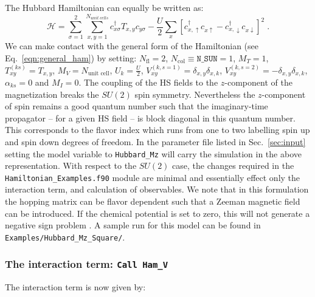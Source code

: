 The Hubbard Hamiltonian can equally be written as:
\begin{equation}
\label{eqn_hubbard_Mz}
\mathcal{H}=
\sum\limits_{\sigma=1}^{2} 
\sum\limits_{x,y =1 }^{N_{unit\; cells }} 
  c^{\dagger}_{x \sigma} T_{x,y}c^{\phantom\dagger}_{y \sigma} 
- \frac{U}{2}\sum\limits_{x}\left[
c^{\dagger}_{x, \uparrow} c^{\phantom\dagger}_{x \uparrow}  -   c^{\dagger}_{x, \downarrow} c^{\phantom\dagger}_{x \downarrow}  \right]^{2}\;.
\end{equation} 
We can make contact with the general form of the Hamiltonian  (see Eq.~\ref{eqn:general_ham}) by setting: 
$N_{\mathrm{fl}} = 2$, $N_{\mathrm{col}} \equiv \texttt{N\_SUN}     =1 $,   $M_T    =    1$,  $T^{(ks)}_{x y}   =  T_{x,y}$,  $M_V   =  N_{\text{unit cell}} $,  $U_{k}       =   \frac{U}{2}$, 
 $V_{x y}^{(k, s=1)} =  \delta_{x,y} \delta_{x,k}  $,  $V_{x y}^{(k, s=2)} =  - \delta_{x,y} \delta_{x,k}  $,  $\alpha_{ks}   = 0  $ and $M_I       = 0 $.   
 The coupling of the HS fields to the $z$-component of   the magnetization breaks the $SU(2)$ spin symmetry. Nevertheless the $z$-component of spin remains a good quantum number such that  the imaginary-time propagator -- for a given HS field -- is block  diagonal in this quantum number. This corresponds to the flavor index  which runs from one to two  labelling spin up and spin down  degrees of freedom.       In the parameter file  listed in  Sec.~\ref{sec:input}  setting the model variable to  \texttt{Hubbard\_Mz}  will carry the simulation in the above representation. 
 With respect to the $SU(2)$ case, the changes required in the \texttt{Hamiltonian\_Examples.f90}   module are  minimal and essentially effect only the interaction term, and calculation of observables.  We note that  in this formulation the  hopping matrix can be flavor dependent such that a Zeeman  magnetic field can be introduced.  If the chemical potential is set to zero, this will not generate a negative sign problem \cite{Wu04,Milat04,Bercx09}.    
 A sample run for this model can be found in \texttt{Examples/Hubbard\_Mz\_Square/}.

\subsubsection{The interaction term: \texttt{Call Ham\_V} } 
The interaction term is now given by: 

